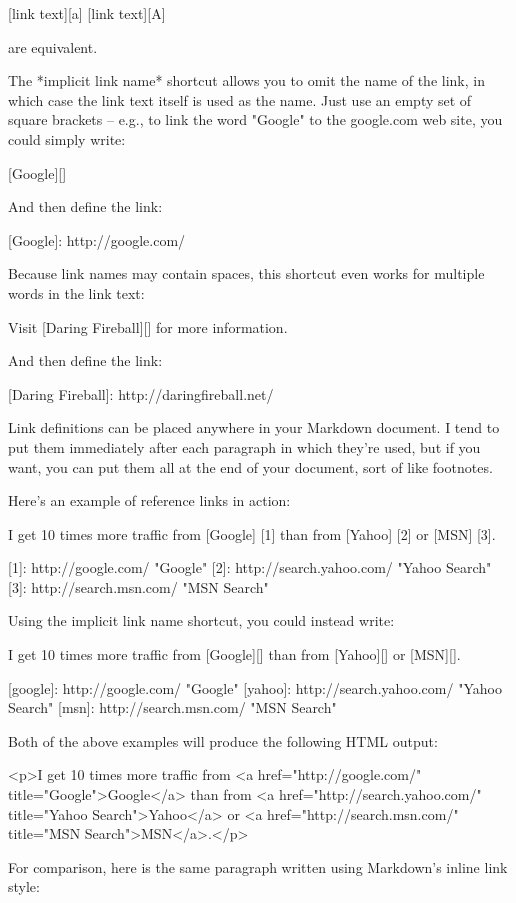 	[link text][a]
	[link text][A]

are equivalent.

The *implicit link name* shortcut allows you to omit the name of the
link, in which case the link text itself is used as the name.
Just use an empty set of square brackets -- e.g., to link the word
"Google" to the google.com web site, you could simply write:

	[Google][]

And then define the link:

	[Google]: http://google.com/

Because link names may contain spaces, this shortcut even works for
multiple words in the link text:

	Visit [Daring Fireball][] for more information.

And then define the link:
	
	[Daring Fireball]: http://daringfireball.net/

Link definitions can be placed anywhere in your Markdown document. I
tend to put them immediately after each paragraph in which they're
used, but if you want, you can put them all at the end of your
document, sort of like footnotes.

Here's an example of reference links in action:

    I get 10 times more traffic from [Google] [1] than from
    [Yahoo] [2] or [MSN] [3].

      [1]: http://google.com/        "Google"
      [2]: http://search.yahoo.com/  "Yahoo Search"
      [3]: http://search.msn.com/    "MSN Search"

Using the implicit link name shortcut, you could instead write:

    I get 10 times more traffic from [Google][] than from
    [Yahoo][] or [MSN][].

      [google]: http://google.com/        "Google"
      [yahoo]:  http://search.yahoo.com/  "Yahoo Search"
      [msn]:    http://search.msn.com/    "MSN Search"

Both of the above examples will produce the following HTML output:

    <p>I get 10 times more traffic from <a href="http://google.com/"
    title="Google">Google</a> than from
    <a href="http://search.yahoo.com/" title="Yahoo Search">Yahoo</a>
    or <a href="http://search.msn.com/" title="MSN Search">MSN</a>.</p>

For comparison, here is the same paragraph written using
Markdown's inline link style:

